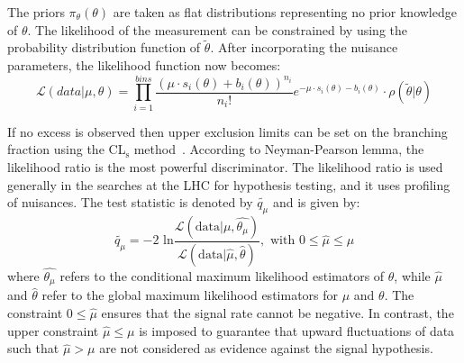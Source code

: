 The priors $\pi_\theta(\theta)$ are taken as flat distributions representing no prior knowledge of $\theta$. The likelihood of the measurement can be constrained by using the probability distribution function of $\tilde{\theta}$. After incorporating the nuisance parameters, the likelihood function now becomes:
\begin{equation}
  \mathcal{L}(data|\mu,\theta)=\prod_{i=1}^{bins}\frac{(\mu\cdot s_i(\theta) + b_i(\theta))^{n_i}}{n_{i}!}e^{-\mu\cdot s_i(\theta) - b_i(\theta)}\cdot\rho(\tilde{\theta}|\theta)
\end{equation}

If no excess is observed then upper exclusion limits can be set on the branching fraction using the CL$_\text{s}$ method~\cite{Read:2002hq, Read:2000ru, Junk:1999kv}. According to Neyman-Pearson lemma, the likelihood ratio is the most powerful discriminator. The likelihood ratio is used generally in the searches at the LHC for hypothesis testing, and it uses profiling of nuisances. The test statistic is denoted by $\tilde{q_\mu}$ and is given by:
\begin{equation}
\label{eq:proflik}
  \tilde{q_\mu}=-2\text{ ln}\frac{\mathcal{L}(\text{data}|\mu,\hat{\theta_\mu})}{\mathcal{L}(\text{data}|\hat{\mu},\hat{\theta})},\text{   with  } 0 \leq \hat{\mu} \leq \mu
\end{equation}
where $\hat{\theta_\mu}$ refers to the conditional maximum likelihood estimators of $\theta$, while $\hat\mu$ and $\hat\theta$ refer to the global maximum likelihood estimators for $\mu$ and $\theta$. The constraint $0 \leq \hat{\mu}$ ensures that the signal rate cannot be negative. In contrast, the upper constraint $\hat{\mu} \leq \mu$ is imposed to guarantee that upward fluctuations of data such that $\hat{\mu} > \mu$ are not considered as evidence against the signal hypothesis.

